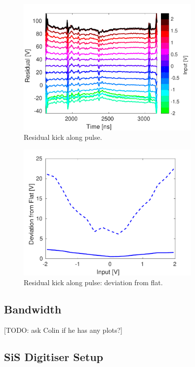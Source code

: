 \begin{figure}
  \centering
  \includegraphics[width=0.8\textwidth]{Figures/commissioning/residualKick_Traces}
  \caption{Residual kick along pulse.}
  \label{f:ampClosure}
\end{figure}

\begin{figure}
  \centering
  \includegraphics[width=0.8\textwidth]{Figures/commissioning/residualKick_Flatness}
  \caption{Residual kick along pulse: deviation from flat.}
  \label{f:ampClosureFlatness}
\end{figure}

\subsection{Bandwidth}
\label{ss:ampBand}

[TODO: ask Colin if he has any plots?]


\subsection{SiS Digitiser Setup}
\label{ss:sisSetup}

